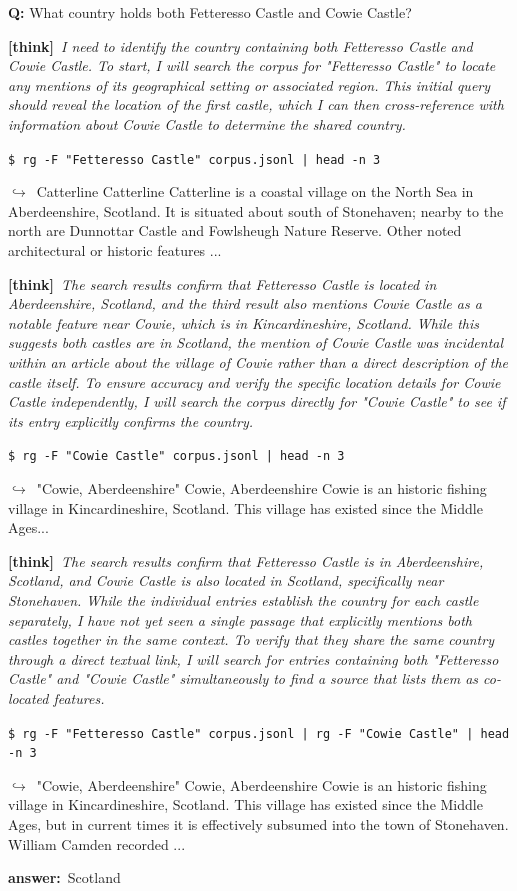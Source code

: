 \documentclass{llmxive}
\providecommand{\thk}[1]{{\footnotesize\textbf{[think]}\ \textit{#1}\par}}
\providecommand{\cmd}[1]{{\footnotesize\texttt{\$\ #1}\par}}
\providecommand{\retr}[1]{{\footnotesize\quad$\hookrightarrow$\ #1\par}}
\providecommand{\ans}[1]{{\footnotesize\textbf{answer:}\ #1\par}}
\begin{document}
\begin{sftbox}[label={ex:sft-castles},title={\textsc{multi-hop intersection (3 hops)}}]
\textbf{Q:} What country holds both Fetteresso Castle and Cowie Castle?\\[1pt]
  \thk{I need to identify the country containing both Fetteresso Castle and Cowie Castle. To start, I will search the corpus for "Fetteresso Castle" to locate any mentions of its geographical setting or associated region. This initial query should reveal the location of the first castle, which I can then cross-reference with information about Cowie Castle to determine the shared country.}
  \cmd{rg -F "Fetteresso Castle" corpus.jsonl | head -n 3}
  \retr{Catterline Catterline Catterline is a coastal village on the North Sea in Aberdeenshire, Scotland. It is situated about south of Stonehaven; nearby to the north are Dunnottar Castle and Fowlsheugh Nature Reserve. Other noted architectural or historic features  ...}
  \thk{The search results confirm that Fetteresso Castle is located in Aberdeenshire, Scotland, and the third result also mentions Cowie Castle as a notable feature near Cowie, which is in Kincardineshire, Scotland. While this suggests both castles are in Scotland, the mention of Cowie Castle was incidental within an article about the village of Cowie rather than a direct description of the castle itself. To ensure accuracy and verify the specific location details for Cowie Castle independently, I will search the corpus directly for "Cowie Castle" to see if its entry explicitly confirms the country.}
  \cmd{rg -F "Cowie Castle" corpus.jsonl | head -n 3}
  \retr{"Cowie, Aberdeenshire" Cowie, Aberdeenshire Cowie is an historic fishing village in Kincardineshire, Scotland. This village has existed since the Middle Ages...}
  \thk{The search results confirm that Fetteresso Castle is in Aberdeenshire, Scotland, and Cowie Castle is also located in Scotland, specifically near Stonehaven. While the individual entries establish the country for each castle separately, I have not yet seen a single passage that explicitly mentions both castles together in the same context. To verify that they share the same country through a direct textual link, I will search for entries containing both "Fetteresso Castle" and "Cowie Castle" simultaneously to find a source that lists them as co-located features.}
  \cmd{rg -F "Fetteresso Castle" corpus.jsonl | rg -F "Cowie Castle" | head -n 3}
  \retr{"Cowie, Aberdeenshire" Cowie, Aberdeenshire Cowie is an historic fishing village in Kincardineshire, Scotland. This village has existed since the Middle Ages, but in current times it is effectively subsumed into the town of Stonehaven. William Camden recorded  ...}
  \ans{Scotland}
\end{sftbox}\medskip
\end{document}
